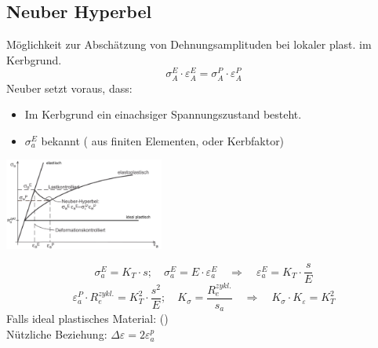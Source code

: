     \subsection{Neuber Hyperbel}
        Möglichkeit zur Abschätzung von Dehnungsamplituden bei lokaler plast. im Kerbgrund.
        \[\sigma_A^E\cdot\varepsilon_A^E = \sigma_A^P \cdot \varepsilon_A^P\]
        Neuber setzt voraus, dass:
        \begin{itemize}
            \item Im Kerbgrund ein einachsiger Spannungszustand besteht.
            \item $\sigma_a^E$ bekannt ( aus finiten Elementen, oder Kerbfaktor)
        \end{itemize}
        \begin{center}
            \includegraphics[width=0.7\linewidth, height=30mm]{images/06/Neuber_Hyperbel.jpeg}
        \end{center}{}
        \[\sigma_a^E = K_T \cdot s; \quad \sigma_a^E = E \cdot \varepsilon_a^E \quad\Rightarrow\quad \varepsilon_a^E = K_T \cdot \frac{s}{E}\]
        \[\varepsilon_a^P \cdot R_{e}^{zykl.} = K_T^2 \cdot \frac{s^2}{E}; \quad K_{\sigma}=\frac{R_{e}^{zykl.}}{s_a} \quad\Rightarrow\quad K_{\sigma} \cdot K_{\varepsilon} = K_T^2\]
        Falls ideal plastisches Material: ()
        \\Nützliche Beziehung: $\Delta\varepsilon = 2\varepsilon_{a}^{p}$
    
    